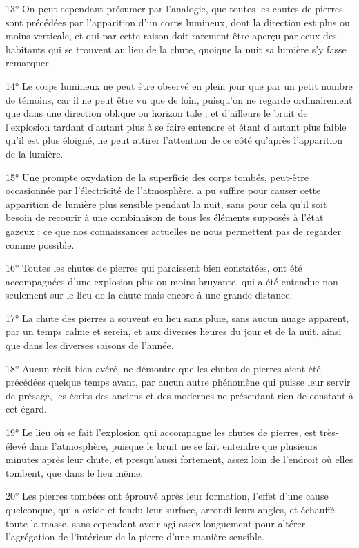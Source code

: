 \documentclass[a4paper, 12pt, oneside, french]{article}
\begin{document}
13° On peut cependant présumer par l'analogie, que toutes les chutes de pierres sont précédées par l'apparition d'un corps lumineux, dont la direction est plus ou moins verticale, et qui par cette raison doit rarement être aperçu par ceux des habitants qui se trouvent au lieu de la chute, quoique la nuit sa lumière s'y fasse remarquer.

14° Le corps lumineux ne peut être observé en plein jour que par un petit nombre de témoins, car il ne peut être vu que de loin, puisqu'on ne regarde ordinairement que dans une direction oblique ou horizon tale ; et d'ailleurs le bruit de l'explosion tardant d'autant plus à se faire entendre et étant d'autant plus faible qu'il est plus éloigné, ne peut attirer l'attention de ce côté qu'après l'apparition de la lumière.

15° Une prompte oxydation de la superficie des corps tombés, peut-être occasionnée par l'électricité de l'atmosphère, a pu suffire pour causer cette apparition de lumière plus sensible pendant la nuit, sans pour cela qu'il soit besoin de recourir à une combinaison de tous les éléments supposés à l'état gazeux ; ce que nos connaissances actuelles ne nous permettent pas de regarder comme possible.

16° Toutes les chutes de pierres qui paraissent bien constatées, ont été accompagnées d'une explosion plus ou moins bruyante, qui a été entendue non-seulement sur le lieu de la chute mais encore à une grande distance.

17° La chute des pierres a souvent eu lieu sans pluie, sans aucun nuage apparent, par un temps calme et serein, et aux diverses heures du jour et de la nuit, ainsi que dans les diverses saisons de l'année.

18° Aucun récit bien avéré, ne démontre que les chutes de pierres aient été précédées quelque temps avant, par aucun autre phénomène qui puisse leur servir de présage, les écrits des anciens et des modernes ne présentant rien de constant à cet égard.

19° Le lieu où se fait l'explosion qui accompagne les chutes de pierres, est très-élevé dans l'atmosphère, puisque le bruit ne se fait entendre que plusieurs minutes après leur chute, et presqu'aussi fortement, assez loin de l'endroit où elles tombent, que dans le lieu même.

20° Les pierres tombées ont éprouvé après leur formation, l'effet d'une cause quelconque, qui a oxide et fondu leur surface, arrondi leurs angles, et échauffé toute la masse, sans cependant avoir agi assez longuement pour altérer l'agrégation de l'intérieur de la pierre d'une manière sensible.
\end{document}
